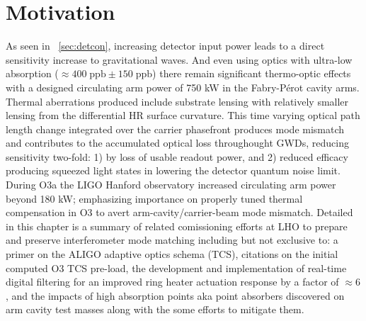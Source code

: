 




\section{Motivation}
As seen in ~\autoref{sec:detcon}, increasing detector input power leads to a direct sensitivity increase to gravitational waves. And even using optics with ultra-low absorption ($\approx 400 \; \mathrm{ppb} \pm 150 \; \mathrm{ppb}$) there remain significant thermo-optic effects with a designed circulating arm power of 750 kW in the Fabry-P\'{e}rot cavity arms. Thermal aberrations produced include substrate lensing with relatively smaller lensing from the differential HR surface curvature. This time varying optical path length change integrated over the carrier phasefront produces mode mismatch and contributes to the accumulated optical loss throughought GWDs, reducing sensitivity two-fold: 1) by loss of usable readout power, and 2) reduced efficacy producing squeezed light states in lowering the detector quantum noise limit.
\\
During O3a the LIGO Hanford observatory increased circulating arm power beyond 180 kW; emphasizing importance on properly tuned thermal compensation in O3 to avert arm-cavity/carrier-beam mode mismatch. Detailed in this chapter is a summary of related comissioning efforts at LHO to prepare and preserve interferometer mode matching including but not exclusive to: a primer on the ALIGO adaptive optics schema (TCS), citations on the initial computed O3 TCS pre-load, the development and implementation of real-time digital filtering for an improved ring heater actuation response by a factor of $\approx 6$, and the impacts of high absorption points aka point absorbers discovered on arm cavity test masses along with the some efforts to mitigate them.

